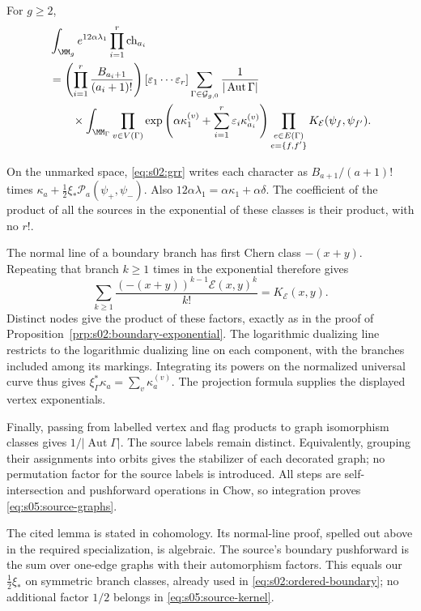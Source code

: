\begin{lmm}\label{lmm:s05:labelled-sources}
For $g\geq2$,
\begin{align}
 &\int_{\MM_g}e^{12\alpha\lambda_1}
              \prod_{i=1}^r\mathrm{ch}_{a_i}\notag\\
 &=\left(\prod_{i=1}^r\frac{B_{a_i+1}}{(a_i+1)!}\right)
 [\varepsilon_1\cdots\varepsilon_r]
 \sum_{\Gamma\in\mathcal G_{g,0}}
 \frac1{|\operatorname{Aut}\Gamma|}\notag\\
 &\qquad\times\int_{\MM_\Gamma}
 \prod_{v\in V(\Gamma)}
  \exp\left(\alpha\kappa_1^{(v)}+
          \sum_{i=1}^r\varepsilon_i\kappa_{a_i}^{(v)}\right)
 \prod_{\substack{e\in E(\Gamma)\\e=\{f,f'\}}}
       K_{\mathcal E}(\psi_f,\psi_{f'}).
 \label{eq:s05:source-graphs}
\end{align}
\end{lmm}
\begin{prf}
On the unmarked space, \eqref{eq:s02:grr} writes each character as
$B_{a+1}/(a+1)!$ times
$\kappa_a+\tfrac12\xi_*\mathcal P_a(\psi_+,\psi_-)$.
Also $12\alpha\lambda_1=\alpha\kappa_1+\alpha\delta$.
The coefficient of the product of all the sources in the
exponential of these classes is their product, with no $r!$.

The normal line of a boundary branch has first Chern class
$-(x+y)$. Repeating that branch $k\geq1$ times in the exponential
therefore gives
\[
 \sum_{k\geq1}\frac{(-(x+y))^{k-1}\mathcal E(x,y)^k}{k!}
 =K_{\mathcal E}(x,y).
\]
Distinct nodes give the product of these factors, exactly as in the
proof of Proposition~\ref{prp:s02:boundary-exponential}. The
logarithmic dualizing line restricts to the logarithmic dualizing
line on each component, with the branches included among its
markings. Integrating its powers on the normalized universal curve
thus gives $\xi_\Gamma^*\kappa_a=\sum_v\kappa_a^{(v)}$.
The projection formula supplies the displayed vertex exponentials.

Finally, passing from labelled vertex and flag products to graph
isomorphism classes gives $1/|\operatorname{Aut}\Gamma|$.
The source labels remain distinct. Equivalently, grouping their
assignments into orbits gives the stabilizer of each decorated
graph; no permutation factor for the source labels is introduced.
All steps are self-intersection and pushforward operations in Chow,
so integration proves \eqref{eq:s05:source-graphs}.
\end{prf}

\begin{rmk}
The cited lemma is stated in cohomology. Its normal-line proof,
spelled out above in the required specialization, is algebraic.
The source's boundary pushforward is the sum over one-edge graphs
with their automorphism factors. This equals our
$\tfrac12\xi_*$ on symmetric branch classes, already used in
\eqref{eq:s02:ordered-boundary}; no additional factor $1/2$ belongs
in \eqref{eq:s05:source-kernel}.
\end{rmk}


